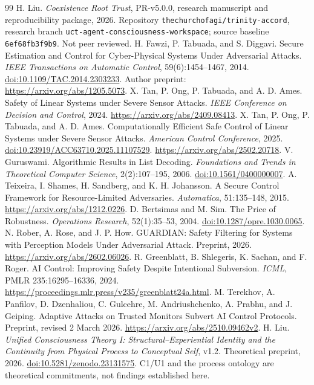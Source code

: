 \clearpage
\begin{thebibliography}{99}\small
{} H. Liu. \emph{Coexistence Root Trust}, PR-v5.0.0, research manuscript and reproducibility package, 2026. Repository \texttt{thechurchofagi/trinity-accord}, research branch \texttt{uct-agent-consciousness-workspace}; source baseline \texttt{6ef68fb3f9b9}. Not peer reviewed.
 H. Fawzi, P. Tabuada, and S. Diggavi. Secure Estimation and Control for Cyber-Physical Systems Under Adversarial Attacks. \emph{IEEE Transactions on Automatic Control}, 59(6):1454--1467, 2014. \href{https://doi.org/10.1109/TAC.2014.2303233}{doi:10.1109/TAC.2014.2303233}. Author preprint: \url{https://arxiv.org/abs/1205.5073}.
 X. Tan, P. Ong, P. Tabuada, and A. D. Ames. Safety of Linear Systems under Severe Sensor Attacks. \emph{IEEE Conference on Decision and Control}, 2024. \url{https://arxiv.org/abs/2409.08413}.
 X. Tan, P. Ong, P. Tabuada, and A. D. Ames. Computationally Efficient Safe Control of Linear Systems under Severe Sensor Attacks. \emph{American Control Conference}, 2025. \href{https://doi.org/10.23919/ACC63710.2025.11107529}{doi:10.23919/ACC63710.2025.11107529}. \url{https://arxiv.org/abs/2502.20718}.
 V. Guruswami. Algorithmic Results in List Decoding. \emph{Foundations and Trends in Theoretical Computer Science}, 2(2):107--195, 2006. \href{https://doi.org/10.1561/0400000007}{doi:10.1561/0400000007}.
 A. Teixeira, I. Shames, H. Sandberg, and K. H. Johansson. A Secure Control Framework for Resource-Limited Adversaries. \emph{Automatica}, 51:135--148, 2015. \url{https://arxiv.org/abs/1212.0226}.
 D. Bertsimas and M. Sim. The Price of Robustness. \emph{Operations Research}, 52(1):35--53, 2004. \href{https://doi.org/10.1287/opre.1030.0065}{doi:10.1287/opre.1030.0065}.
 N. Rober, A. Rose, and J. P. How. GUARDIAN: Safety Filtering for Systems with Perception Models Under Adversarial Attack. Preprint, 2026. \url{https://arxiv.org/abs/2602.06026}.
 R. Greenblatt, B. Shlegeris, K. Sachan, and F. Roger. AI Control: Improving Safety Despite Intentional Subversion. \emph{ICML}, PMLR 235:16295--16336, 2024. \url{https://proceedings.mlr.press/v235/greenblatt24a.html}.
 M. Terekhov, A. Panfilov, D. Dzenhaliou, C. Gulcehre, M. Andriushchenko, A. Prabhu, and J. Geiping. Adaptive Attacks on Trusted Monitors Subvert AI Control Protocols. Preprint, revised 2 March 2026. \url{https://arxiv.org/abs/2510.09462v2}.
 H. Liu. \emph{Unified Consciousness Theory I: Structural--Experiential Identity and the Continuity from Physical Process to Conceptual Self}, v1.2. Theoretical preprint, 2026. \href{https://doi.org/10.5281/zenodo.23131575}{doi:10.5281/zenodo.23131575}. C1/U1 and the process ontology are theoretical commitments, not findings established here.
\end{thebibliography}

